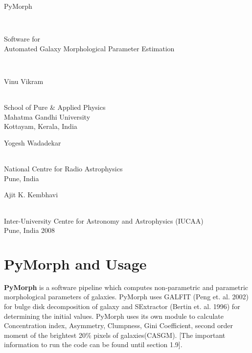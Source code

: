 \documentclass[a4paper,10pt]{article}
\newcommand{\red}[1]{{\color{red}[#1]}}
\begin{document}
\begin{titlepage}
\begin{center}

\begin{Huge}PyMorph\end{Huge}\\
\begin{Large}Software for \\Automated Galaxy Morphological Parameter Estimation\end{Large}\\

\begin{large}
\end{large}
\vspace{5cm}
\vspace{0.5cm}
\begin{Large}Vinu Vikram\end{Large}\\
School of Pure \& Applied Physics\\
Mahatma Gandhi University\\
Kottayam, Kerala, India\\
\vspace{0.3cm}
\begin{Large}Yogesh Wadadekar\end{Large}\\
National Centre for Radio Astrophysics\\
Pune, India\\
\vspace{0.3cm}
\begin{Large}Ajit K. Kembhavi \end{Large}\\
Inter-University Centre for Astronomy and Astrophysics (IUCAA)\\
Pune, India
\vspace{5cm}
2008
\end{center}
\end{titlepage}
\tableofcontents
\clearpage
\section{PyMorph and Usage}
{\bf PyMorph} is a software pipeline which computes non-parametric and parametric morphological parameters of galaxies. PyMorph uses GALFIT (Peng et. al. 2002) for bulge disk decomposition of galaxy and SExtractor (Bertin et. al. 1996) for determining the initial values. PyMorph uses its own module to calculate Concentration index, Asymmetry, Clumpness, Gini Coefficient, second order moment of the brightest 20\% pixels of galaxies(CASGM). \red{The important information to run the code can be found until section 1.9}.
\end{document}
